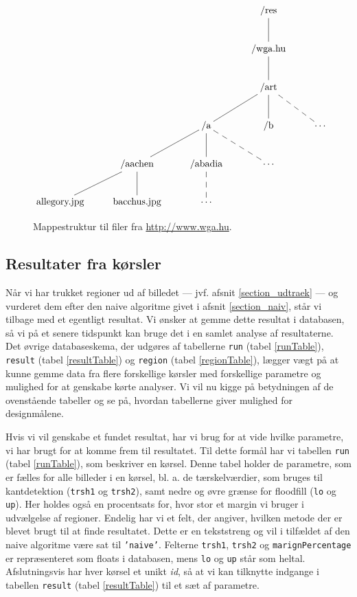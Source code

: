 {%
\begin{figure}[!h]
    \centering
$
\xymatrix{
 &  &   & \ar @{-} [d] \textrm{/res}  &                                                     \\
 &  &   & \ar @{-} [d] \textrm{/wga.hu}  &                                                  \\
 &  &   & \ar @{-} [dl] \ar @{-} [d] \ar @{--} [dr] \textrm{/art} &                         \\
 &  & \ar @{-} [dl] \ar @{-} [d] \ar @{--} [dr] \textrm{/a} & \textrm{/b} & \cdots          \\
 & \ar @{-} [dl] \ar @{-} [d] \textrm{/aachen} & \ar @{--} [d] \textrm{/abadia} & \cdots    \\
\textrm{allegory.jpg} & \textrm{bacchus.jpg} & \cdots &   &
}
$
    \caption{Mappestruktur til filer fra
        \href{http://www.wga.hu}{http://www.wga.hu}.}
    \label{mappestruktur}
\end{figure}

\subsection{Resultater fra kørsler\label{section_results}}
Når vi har trukket regioner ud af billedet --- jvf. afsnit
\ref{section_udtraek} --- og vurderet dem efter den naive algoritme
givet i afsnit \ref{section_naiv}, står vi tilbage med et egentligt
resultat. Vi ønsker at gemme dette resultat i databasen, så vi på et
senere tidspunkt kan bruge det i en samlet analyse af resultaterne. Det
øvrige databaseskema, der udgøres af tabellerne \texttt{run} (tabel
\ref{runTable}), \texttt{result} (tabel \ref{resultTable}) og
\texttt{region} (tabel \ref{regionTable}), lægger vægt på at kunne gemme
data fra flere forskellige kørsler med forskellige parametre og mulighed
for at genskabe kørte analyser. Vi vil nu kigge på betydningen af de
ovenstående tabeller og se på, hvordan tabellerne giver mulighed for
designmålene.

Hvis vi vil genskabe et fundet resultat, har vi brug for at vide hvilke
parametre, vi har brugt for at komme frem til resultatet. Til dette
formål har vi tabellen \texttt{run} (tabel \ref{runTable}), som
beskriver en kørsel. Denne tabel holder de parametre, som er fælles for
alle billeder i en kørsel, bl. a. de tærskelværdier, som bruges til
kantdetektion (\texttt{trsh1} og \texttt{trsh2}), samt nedre og øvre
grænse for floodfill (\texttt{lo} og \texttt{up}). Her holdes også en
procentsats for, hvor stor et margin vi bruger i udvælgelse af
regioner. Endelig har vi et felt, der angiver, hvilken metode der er
blevet brugt til at finde resultatet. Dette er en tekststreng og vil i
tilfældet af den naive algoritme være sat til \texttt{'naive'}. Felterne
\texttt{trsh1}, \texttt{trsh2} og \texttt{marignPercentage} er
repræsenteret som floats i databasen, mens \texttt{lo} og \texttt{up}
står som heltal. Afslutningsvis har hver kørsel et unikt \emph{id}, så
at vi kan tilknytte indgange i tabellen \texttt{result} (tabel
\ref{resultTable}) til et sæt af parametre.

}
